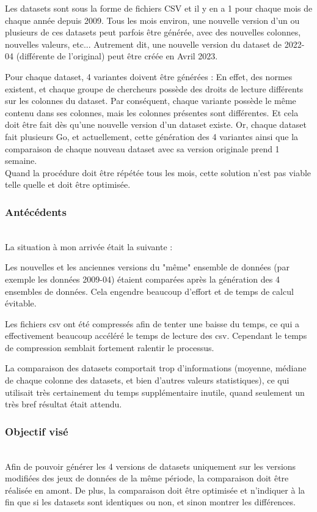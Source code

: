 Les datasets sont sous la forme de fichiers CSV et il y en a 1 pour chaque mois de chaque année depuis 2009.
Tous les mois environ, une nouvelle version d'un ou plusieurs de ces datasets peut parfois être générée, avec des nouvelles colonnes, nouvelles valeurs, etc...
Autrement dit, une nouvelle version du dataset de 2022-04 (différente de l'original) peut être créée en Avril 2023.

Pour chaque dataset, 4 variantes doivent être générées : En effet, des normes existent, et chaque groupe de chercheurs possède des droits de lecture différents sur les colonnes du dataset.
Par conséquent, chaque variante possède le même contenu dans ses colonnes, mais les colonnes présentes sont différentes.
Et cela doit être fait dès qu'une nouvelle version d'un dataset existe.
Or, chaque dataset fait plusieurs Go, et actuellement, cette génération des 4 variantes ainsi que la comparaison de chaque nouveau dataset avec sa version originale prend 1 semaine. 
\\

Quand la procédure doit être répétée tous les mois, cette solution n'est pas viable telle quelle et doit être optimisée.

\subsubsection{Antécédents}
~\\
La situation à mon arrivée était la suivante :

Les nouvelles et les anciennes versions du "même" ensemble de données (par exemple les données 2009-04) étaient comparées après la génération des 4 ensembles de données.
Cela engendre beaucoup d'effort et de temps de calcul évitable.

Les fichiers csv ont été compressés afin de tenter une baisse du temps, ce qui a effectivement beaucoup accéléré le temps de lecture des csv. 
Cependant le temps de compression semblait fortement ralentir le processus. 

La comparaison des datasets comportait trop d'informations (moyenne, médiane de chaque colonne des datasets, et bien d'autres valeurs statistiques), ce qui utilisait très certainement du temps supplémentaire inutile, quand seulement un très bref résultat était attendu.

\subsubsection{Objectif visé}
~\\
Afin de pouvoir générer les 4 versions de datasets uniquement sur les versions modifiées des jeux de données de la même période, la comparaison doit être réalisée en amont.
De plus, la comparaison doit être optimisée et n'indiquer à la fin que si les datasets sont identiques ou non, et sinon montrer les différences.
\\
